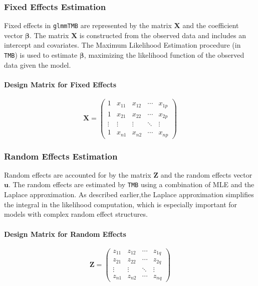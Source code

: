 \documentclass[12pt, twoside,hidelinks]{article}
\theoremstyle{definition}
\numberwithin{equation}{section}
\begin{document}
\subsubsection{Fixed Effects Estimation}\label{sec:rpack:construct:fixed}

Fixed effects in \texttt{glmmTMB} are represented by the matrix \( \mathbf{X} \) and the coefficient vector \( \boldsymbol{\beta} \). The matrix \( \mathbf{X} \) is constructed from the observed data and includes an intercept and covariates. The Maximum Likelihood Estimation   procedure (in \texttt{TMB}) is used to estimate \( \boldsymbol{\beta} \), maximizing the likelihood function of the observed data given the model.

\paragraph{Design Matrix for Fixed Effects}

\begin{equation}
\mathbf{X} = \begin{pmatrix}
1 & x_{11} & x_{12} & \cdots & x_{1p} \\
1 & x_{21} & x_{22} & \cdots & x_{2p} \\
\vdots & \vdots & \vdots & \ddots & \vdots \\
1 & x_{n1} & x_{n2} & \cdots & x_{np}
\end{pmatrix}
\end{equation}

\subsubsection{Random Effects Estimation}\label{sec:rpack:construct:random}

Random effects are accounted for by the matrix \( \mathbf{Z} \) and the random effects vector \( \boldsymbol{u} \). The random effects are estimated by \texttt{TMB} using a combination of MLE and the Laplace approximation. As described earlier,the Laplace approximation simplifies the integral in the likelihood computation, which is especially important for models with complex random effect structures.

\paragraph{Design Matrix for Random Effects}

\begin{equation}
\mathbf{Z} = \begin{pmatrix}
z_{11} & z_{12} & \cdots & z_{1q} \\
z_{21} & z_{22} & \cdots & z_{2q} \\
\vdots & \vdots & \ddots & \vdots \\
z_{n1} & z_{n2} & \cdots & z_{nq}
\end{pmatrix}
\end{equation}
\end{document}
